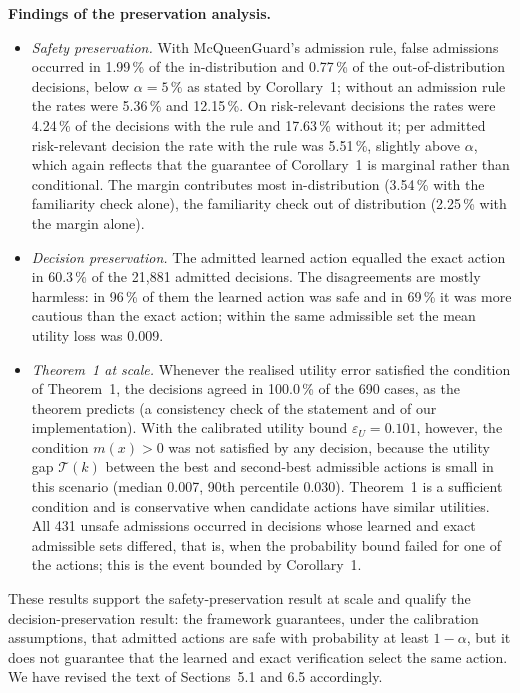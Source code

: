 \documentclass[11pt]{article}
\begin{document}
\textbf{Findings of the preservation analysis.}
\begin{itemize}[leftmargin=1.3em,itemsep=2pt]
\item \emph{Safety preservation.} With McQueenGuard's admission rule, false admissions occurred in 1.99\,\% of the in-distribution and 0.77\,\% of the out-of-distribution decisions, below $\alpha=5\,\%$ as stated by Corollary~1; without an admission rule the rates were 5.36\,\% and 12.15\,\%. On risk-relevant decisions the rates were 4.24\,\% of the decisions with the rule and 17.63\,\% without it; per admitted risk-relevant decision the rate with the rule was 5.51\,\%, slightly above $\alpha$, which again reflects that the guarantee of Corollary~1 is marginal rather than conditional. The margin contributes most in-distribution (3.54\,\% with the familiarity check alone), the familiarity check out of distribution (2.25\,\% with the margin alone).
\item \emph{Decision preservation.} The admitted learned action equalled the exact action in 60.3\,\% of the 21,881 admitted decisions. The disagreements are mostly harmless: in 96\,\% of them the learned action was safe and in 69\,\% it was more cautious than the exact action; within the same admissible set the mean utility loss was 0.009.
\item \emph{Theorem~1 at scale.} Whenever the realised utility error satisfied the condition of Theorem~1, the decisions agreed in 100.0\,\% of the 690 cases, as the theorem predicts (a consistency check of the statement and of our implementation). With the calibrated utility bound $\varepsilon_U=0.101$, however, the condition $m(x)>0$ was not satisfied by any decision, because the utility gap $\mathcal{T}(k)$ between the best and second-best admissible actions is small in this scenario (median 0.007, 90th percentile 0.030). Theorem~1 is a sufficient condition and is conservative when candidate actions have similar utilities. All 431 unsafe admissions occurred in decisions whose learned and exact admissible sets differed, that is, when the probability bound failed for one of the actions; this is the event bounded by Corollary~1.
\end{itemize}
These results support the safety-preservation result at scale and qualify the decision-preservation result: the framework guarantees, under the calibration assumptions, that admitted actions are safe with probability at least $1-\alpha$, but it does not guarantee that the learned and exact verification select the same action. We have revised the text of Sections~5.1 and 6.5 accordingly.
\end{document}
